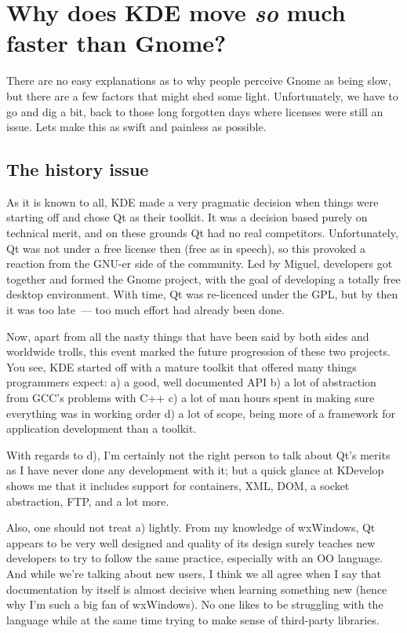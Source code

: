 \documentclass{book}
\begin{document}
\section{Why does KDE move \emph{so} much faster than Gnome?}

There are no easy explanations as to why people perceive Gnome as
being slow, but there are a few factors that might shed some
light. Unfortunately, we have to go and dig a bit, back to those long
forgotten days where licenses were still an issue. Lets make this as
swift and painless as possible.

\subsection{The history issue}

As it is known to all, KDE made a very pragmatic decision when things
were starting off and chose Qt as their toolkit. It was a decision
based purely on technical merit, and on these grounds Qt had no real
competitors. Unfortunately, Qt was not under a free license then (free
as in speech), so this provoked a reaction from the GNU-er side of the
community. Led by Miguel, developers got together and formed the Gnome
project, with the goal of developing a totally free desktop
environment. With time, Qt was re-licenced under the GPL, but by then
it was too late~--- too much effort had already been done.

Now, apart from all the nasty things that have been said by both sides
and worldwide trolls, this event marked the future progression of
these two projects. You see, KDE started off with a mature toolkit
that offered many things programmers expect: a) a good, well
documented API b) a lot of abstraction from GCC's problems
with C++ c) a lot of man hours spent in making sure everything was in
working order d) a lot of scope, being more of a framework for
application development than a toolkit.

With regards to d), I'm certainly not the right person to talk about
Qt's merits as I have never done any development with it; but a quick
glance at KDevelop shows me that it includes support for containers,
XML, DOM, a socket abstraction, FTP, and a lot more.

Also, one should not treat a) lightly. From my knowledge of wxWindows,
Qt appears to be very well designed and quality of its design surely
teaches new developers to try to follow the same practice, especially
with an OO language. And while we're talking about new users, I think
we all agree when I say that documentation by itself is almost
decisive when learning something new (hence why I'm such a big fan of
wxWindows). No one likes to be struggling with the language while at
the same time trying to make sense of third-party libraries.
\end{document}
